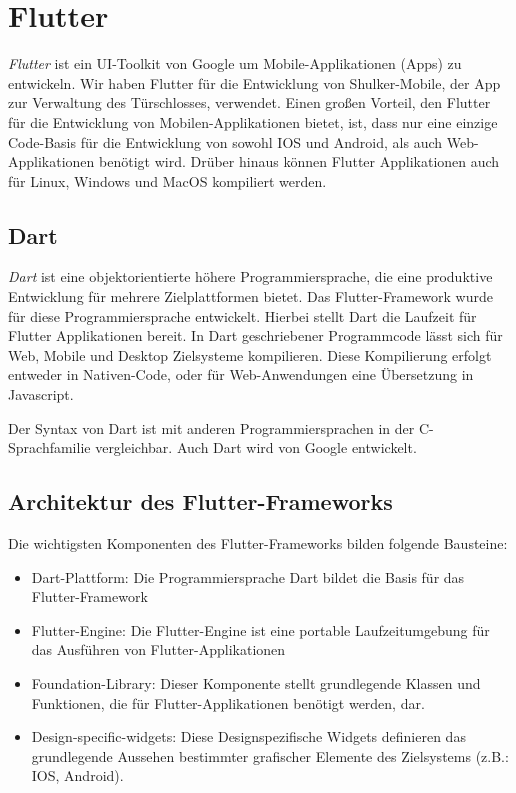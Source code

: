 \section{Flutter}
\label{flutter}
\textit{Flutter} ist ein UI-Toolkit von Google um Mobile-Applikationen (Apps) zu entwickeln.
Wir haben Flutter für die Entwicklung von Shulker-Mobile, der App zur Verwaltung des Türschlosses, verwendet.
Einen großen Vorteil, den Flutter für die Entwicklung von Mobilen-Applikationen bietet, ist, 
dass nur eine einzige Code-Basis für die Entwicklung von sowohl IOS und Android, als auch Web-Applikationen benötigt wird.
Drüber hinaus können Flutter Applikationen auch für Linux, Windows und MacOS kompiliert werden. 
\cite{flutterwikipediaEN}

\subsection{Dart}
\textit{Dart} ist eine objektorientierte höhere Programmiersprache, die eine produktive Entwicklung für
mehrere Zielplattformen bietet. Das Flutter-Framework wurde für diese Programmiersprache entwickelt.
Hierbei stellt Dart die Laufzeit für Flutter Applikationen bereit.
In Dart geschriebener Programmcode lässt sich für Web, Mobile und Desktop Zielsysteme kompilieren. 
Diese Kompilierung erfolgt entweder in Nativen-Code, oder für Web-Anwendungen eine Übersetzung in Javascript.

Der Syntax von Dart ist mit anderen Programmiersprachen in der C-Sprachfamilie vergleichbar.
Auch Dart wird von Google entwickelt.
\cite{dartwikipedia}

\subsection{Architektur des Flutter-Frameworks}
Die wichtigsten Komponenten des Flutter-Frameworks bilden folgende Bausteine: \cite{flutterwikipediaEN}
\begin{itemize}
    \item Dart-Plattform: Die Programmiersprache Dart bildet die Basis für das Flutter-Framework
    \item Flutter-Engine: Die Flutter-Engine ist eine portable Laufzeitumgebung für das Ausführen von Flutter-Applikationen
    \item Foundation-Library: Dieser Komponente stellt grundlegende Klassen und Funktionen, die für 
    Flutter-Applikationen benötigt werden, dar.
    \item Design-specific-widgets: Diese Designspezifische Widgets definieren das grundlegende Aussehen
    bestimmter grafischer Elemente des Zielsystems (z.B.: IOS, Android).
\end{itemize}

